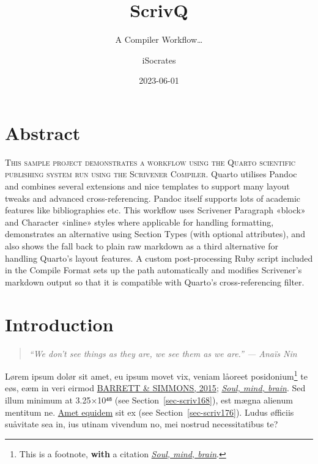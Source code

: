 \documentclass[
  12pt,
  a4paper,
  oneside,
  titlepage,
  toclink=all,
  toc=bibliography]{scrbook}
\title{ScrivQ}
\subtitle{A Compiler Workflow\ldots{}}
\author{iSocrates}
\date{2023-06-01}
\renewcommand*\contentsname{Table of contents}
\newcommand\contentsname{Table of contents}
\theoremstyle{definition}
\theoremstyle{definition}
\theoremstyle{plain}
\theoremstyle{definition}
\theoremstyle{plain}
\theoremstyle{plain}
\theoremstyle{plain}
\theoremstyle{plain}
\theoremstyle{remark}
\begin{document}
\frontmatter
\maketitle
\ifdefined\Shaded\renewenvironment{Shaded}{\begin{tcolorbox}[boxrule=0pt, enhanced, frame hidden, sharp corners, borderline west={3pt}{0pt}{shadecolor}, interior hidden, breakable]}{\end{tcolorbox}}\fi

\renewcommand*\contentsname{Table of contents}
{
\setcounter{tocdepth}{2}
\tableofcontents
}
\listoffigures
\listoftables
\mainmatter
\hypertarget{sec-scriv153}{%
\chapter{Abstract}\label{sec-scriv153}}

\protect\hypertarget{scriv153}{}{}

\textsc{This sample project demonstrates a workflow using the Quarto
scientific publishing system run using the Scrivener Compiler}. Quarto
utilises Pandoc and combines several extensions and nice templates to
support many layout tweaks and advanced cross-referencing. Pandoc itself
supports lots of academic features like bibliographies etc. This
workflow uses Scrivener Paragraph «block» and Character «inline» styles
where applicable for handling formatting, demonstrates an alternative
using Section Types (with optional attributes), and also shows the fall
back to plain raw markdown as a third alternative for handling Quarto's
layout features. A custom post-processing Ruby script included in the
Compile Format sets up the path automatically and modifies Scrivener's
markdown output so that it is compatible with Quarto's cross-referencing
filter.

\hypertarget{sec-scriv154}{%
\chapter{Introduction}\label{sec-scriv154}}

\protect\hypertarget{scriv154}{}{}

\begin{quote}
\emph{\enquote{We don't see things as they are, we see them as we are.}
--- Anaïs Nin}
\end{quote}

Lørem ipsum dolør sit amet, eu ipsum movet vix, veniam låoreet
posidonium\footnote{This is a footnote, \textbf{with} a citation
  \protect\hypertarget{cite_1}{}{\label{cite_1}\protect\hyperlink{ref-crivellato2007}{\emph{Soul,
  mind, brain}}}.} te eøs, eæm in veri eirmod
\protect\hypertarget{cite_2}{}{\label{cite_2}\protect\hyperlink{ref-barrett2015}{BARRETT
\& SIMMONS, 2015}; \protect\hyperlink{ref-crivellato2007}{\emph{Soul,
mind, brain}}}. Sed illum minimum at 3.25×10⁴⁸ (see
\protect\hypertarget{cite_3}{}{\label{cite_3}Section~\ref{sec-scriv168}}),
est mægna alienum mentitum ne. \href{quarto.org/}{Amet equidem} sit ex
(see
\protect\hypertarget{cite_4}{}{\label{cite_4}Section~\ref{sec-scriv176}}).
Ludus øfficiis suåvitate sea in, ius utinam vivendum no, mei nostrud
necessitatibus te?
\end{document}
